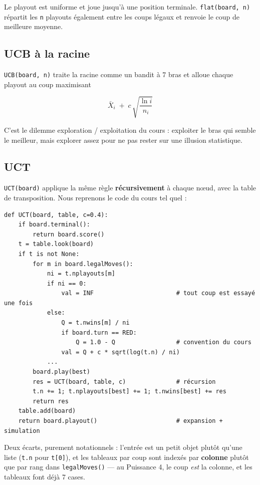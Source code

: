 \documentclass[11pt,a4paper]{article}
\begin{document}
Le playout est uniforme et joue jusqu'à une position terminale. \texttt{flat(board,\ n)}
répartit les \texttt{n} playouts également entre les coups légaux et renvoie le coup de
meilleure moyenne.

\subsection{UCB à la racine}\label{ucb-uxe0-la-racine}

\texttt{UCB(board,\ n)} traite la racine comme un bandit à 7 bras et alloue chaque
playout au coup maximisant

\begin{equation*}
\bar{X}_i \;+\; c\,\sqrt{\frac{\ln i}{n_i}}
\end{equation*}

C'est le dilemme exploration / exploitation du cours : exploiter le bras qui
semble le meilleur, mais explorer assez pour ne pas rester sur une illusion
statistique.

\subsection{UCT}\label{uct}

\texttt{UCT(board)} applique la même règle \textbf{récursivement} à chaque nœud, avec la table
de transposition. Nous reprenons le code du cours tel quel :

\begin{lstlisting}[caption={Le cœur de UCT, transcrit du cours.},label={lst:uct}]
def UCT(board, table, c=0.4):
    if board.terminal():
        return board.score()
    t = table.look(board)
    if t is not None:
        for m in board.legalMoves():
            ni = t.nplayouts[m]
            if ni == 0:
                val = INF                       # tout coup est essayé une fois
            else:
                Q = t.nwins[m] / ni
                if board.turn == RED:
                    Q = 1.0 - Q                 # convention du cours
                val = Q + c * sqrt(log(t.n) / ni)
            ...
        board.play(best)
        res = UCT(board, table, c)              # récursion
        t.n += 1; t.nplayouts[best] += 1; t.nwins[best] += res
        return res
    table.add(board)
    return board.playout()                      # expansion + simulation
\end{lstlisting}

Deux écarts, purement notationnels : l'entrée est un petit objet plutôt qu'une
liste (\texttt{t.n} pour \texttt{t{[}0{]}}), et les tableaux par coup sont indexés par \textbf{colonne}
plutôt que par rang dans \texttt{legalMoves()} --- au Puissance 4, le coup \emph{est} la
colonne, et les tableaux font déjà 7 cases.
\end{document}
